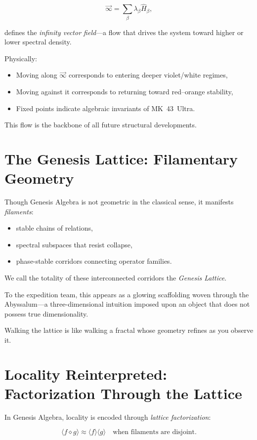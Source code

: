 \[
\vec{\infty} = 
\sum_{\beta} \lambda_\beta \hat{H}_\beta,
\]

defines the \emph{infinity vector field}---a flow that drives the system toward higher or lower
spectral density.

Physically:

\begin{itemize}
  \item Moving along $\vec{\infty}$ corresponds to entering deeper violet/white regimes,
  \item Moving against it corresponds to returning toward red--orange stability,
  \item Fixed points indicate algebraic invariants of MK~43~Ultra.
\end{itemize}

This flow is the backbone of all future structural developments.

\section{The Genesis Lattice: Filamentary Geometry}
Though Genesis Algebra is not geometric in the classical sense, it manifests \emph{filaments}:

\begin{itemize}
  \item stable chains of relations,
  \item spectral subspaces that resist collapse,
  \item phase-stable corridors connecting operator families.
\end{itemize}

We call the totality of these interconnected corridors the \emph{Genesis Lattice}.

To the expedition team, this appears as a glowing scaffolding woven through the Abyssalum---a
three-dimensional intuition imposed upon an object that does not possess true dimensionality.

Walking the lattice is like walking a fractal whose geometry refines as you observe it.

\section{Locality Reinterpreted: Factorization Through the Lattice}
In Genesis Algebra, locality is encoded through \emph{lattice factorization}:

\[
\langle f \diamond g \rangle
\approx
\langle f \rangle \langle g \rangle
\quad\text{when filaments are disjoint.}
\]

